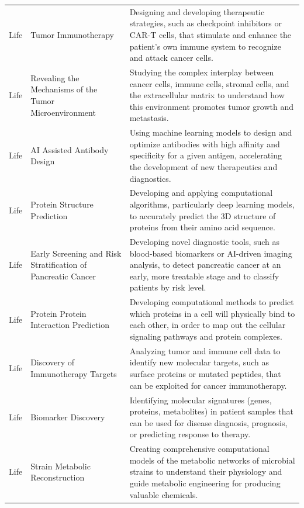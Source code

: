 \begin{longtable}{p{2cm}p{6cm}p{7cm}}
\rowcolor{LifeColor} Life & Tumor Immunotherapy & Designing and developing therapeutic strategies, such as checkpoint inhibitors or CAR-T cells, that stimulate and enhance the patient's own immune system to recognize and attack cancer cells. \\
\rowcolor{LifeColor} Life & Revealing the Mechanisms of the Tumor Microenvironment & Studying the complex interplay between cancer cells, immune cells, stromal cells, and the extracellular matrix to understand how this environment promotes tumor growth and metastasis. \\
\rowcolor{LifeColor} Life & AI Assisted Antibody Design & Using machine learning models to design and optimize antibodies with high affinity and specificity for a given antigen, accelerating the development of new therapeutics and diagnostics. \\
\rowcolor{LifeColor} Life & Protein Structure Prediction & Developing and applying computational algorithms, particularly deep learning models, to accurately predict the 3D structure of proteins from their amino acid sequence. \\
\rowcolor{LifeColor} Life & Early Screening and Risk Stratification of Pancreatic Cancer & Developing novel diagnostic tools, such as blood-based biomarkers or AI-driven imaging analysis, to detect pancreatic cancer at an early, more treatable stage and to classify patients by risk level. \\
\rowcolor{LifeColor} Life & Protein Protein Interaction Prediction & Developing computational methods to predict which proteins in a cell will physically bind to each other, in order to map out the cellular signaling pathways and protein complexes. \\
\rowcolor{LifeColor} Life & Discovery of Immunotherapy Targets & Analyzing tumor and immune cell data to identify new molecular targets, such as surface proteins or mutated peptides, that can be exploited for cancer immunotherapy. \\
\rowcolor{LifeColor} Life & Biomarker Discovery & Identifying molecular signatures (genes, proteins, metabolites) in patient samples that can be used for disease diagnosis, prognosis, or predicting response to therapy. \\
\rowcolor{LifeColor} Life & Strain Metabolic Reconstruction & Creating comprehensive computational models of the metabolic networks of microbial strains to understand their physiology and guide metabolic engineering for producing valuable chemicals. \\

\end{longtable}
